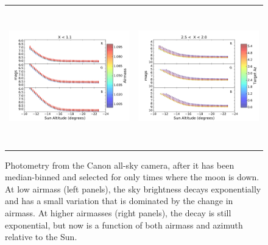 \documentclass[]{spie}
\begin{document}
\begin{figure}[ht]
  \begin{center}
  \begin{tabular}{c c}
  \includegraphics[height=6cm]{plots/altDecay.pdf} & \includegraphics[height=6cm]{plots/altDecayHA.pdf}
  \end{tabular}
  \end{center}
  \caption{Photometry from the Canon all-sky camera, after it has been median-binned and selected for only times where the moon is down.  At low airmass (left panels), the sky brightness decays exponentially and has a small variation that is dominated by the change in airmass.  At higher airmasses (right panels), the decay is still exponential, but now is a function of both airmass and azimuth relative to the Sun. \label{fig:twiExp}}
\end{figure}
\end{document}
